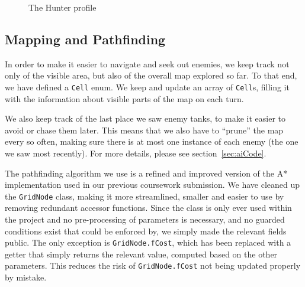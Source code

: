 \documentclass[11pt]{article}
\begin{document}
{\begin{landscape}
\begin{figure}[h]
  \caption{The Hunter profile}
  \label{fig:hunter}
\end{figure}
\vspace*{\fill}
\end{landscape}
}

\subsection{Mapping and Pathfinding}

In order to make it easier to navigate and seek out enemies, we keep track not only of the visible area, but also of the overall map explored so far.  To that end, we have defined a \verb|Cell| enum. We keep and update an array of \verb|Cell|s, filling it with the information about visible parts of the map on each turn. 

We also keep track of the last place we saw enemy tanks, to make it easier to avoid or chase them later. This means that we also have to ``prune'' the map every so often, making sure there is at most one instance of each enemy (the one we saw most recently). For more details, please see section~\ref{sec:aiCode}.

The pathfinding algorithm we use is a refined and improved version of the A* implementation used in our previous coursework submission\cite{theGloriousWe}. We have cleaned up the \verb|GridNode| class, making it more streamlined, smaller and easier to use by removing redundant accessor functions. Since the class is only ever used within the project and no pre-processing of parameters is necessary, and no guarded conditions exist that could be enforced by, we simply made the relevant fields public. The only exception is \verb|GridNode.fCost|, which has been replaced with a getter that simply returns the relevant value, computed based on the other parameters. This reduces the risk of \verb|GridNode.fCost| not being updated properly by mistake.
\end{document}
